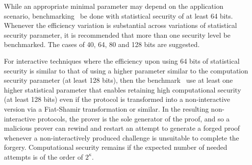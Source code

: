 	While an appropriate minimal parameter may depend on the application scenario, benchmarking \shall\ be done with statistical security of at least 64 bits.
	Whenever the efficiency variation is substantial across variations of statistical security parameter, it is recommended that more than one security level be benchmarked. 
    The cases of 40, 64, 80 and 128 bits are suggested.

	For interactive techniques where the efficiency upon using 64 bits of statistical security is similar to that of using a higher parameter similar to the computation security parameter (at least 128 bits), then the benchmark \should\ use at least one higher statistical parameter that enables retaining high computational security (at least 128 bits) even if the protocol is transformed into a non-interactive version via a Fiat-Shamir transformation or similar.
	In the resulting non-interactive protocols, the prover is the sole generator of the proof, and so a malicious prover can rewind and restart an attempt to generate a forged proof
whenever a non-interactively produced challenge is unsuitable to complete the forgery.
	Computational security remains if the expected number of needed attempts is of the order of $2^{\kappa}$.
	\loosen

